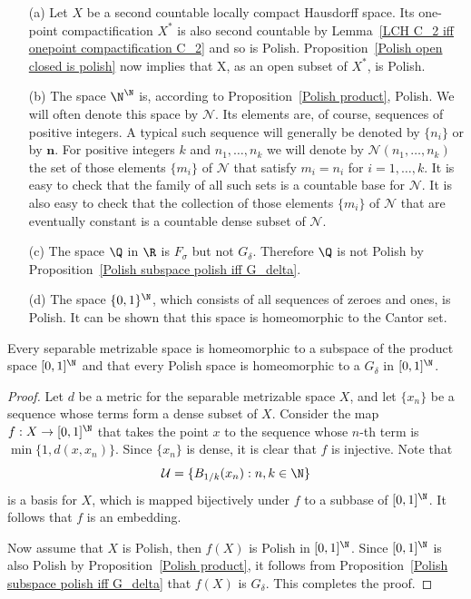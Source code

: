 \begin{example}
\mbox{}
\begin{itemize}
\item[(a)] Let $X$ be a second countable locally compact Hausdorff space. Its one-point compactification $X^*$ is also second countable by Lemma~\ref{LCH C_2 iff onepoint compactification C_2} and so is Polish. Proposition~\ref{Polish open closed is polish} now implies that X, as an open subset of $X^*$, is Polish.
\item[(b)] The space $\N^\N$ is, according to Proposition~\ref{Polish product}, Polish. We will often denote this space by $\mathscr{N}$. Its elements are, of course, sequences of positive integers. A typical such sequence will generally be denoted by $\{n_i\}$ or by $\mathbf{n}$. For positive integers $k$ and $n_1,\dots,n_k$ we will denote by $\mathscr{N}(n_1,\dots,n_k)$ the set of those elements $\{m_i\}$ of $\mathscr{N}$ that satisfy $m_i=n_i$ for $i=1,\dots,k$. It is easy to check that the family of all such sets is a countable base for $\mathscr{N}$. It is also easy to check that the collection of those elements $\{m_i\}$ of $\mathscr{N}$ that are eventually constant is a countable dense subset of $\mathscr{N}$.
\item[(c)] The space $\Q$ in $\R$ is $F_\sigma$ but not $G_\delta$. Therefore $\Q$ is not Polish by Proposition~\ref{Polish subspace polish iff G_delta}.
\item[(d)] The space $\{0,1\}^\N$, which consists of all sequences of zeroes and ones, is Polish. It can be shown that this space is homeomorphic to the Cantor set. 
\end{itemize}
\end{example}
\begin{proposition}\label{Polish embedd in [0,1]^N}
Every separable metrizable space is homeomorphic to a subspace of the product space $[0,1]^\N$ and that every Polish space is homeomorphic to a $G_\delta$ in $[0,1]^\N$.
\end{proposition}
\begin{proof}
Let $d$ be a metric for the separable metrizable space $X$, and let $\{x_n\}$ be a sequence whose terms form a dense subset of $X$. Consider the map $f:X\to[0,1]^\N$ that takes the point $x$ to the sequence whose $n$-th term is $\min\{1,d(x,x_n)\}$. Since $\{x_n\}$ is dense, it is clear that $f$ is injective. Note that
\[\mathcal{U}=\{B_{1/k}(x_n):n,k\in\N\}\]
is a basis for $X$, which is mapped bijectively under $f$ to a subbase of $[0,1]^\N$. It follows that $f$ is an embedding.\par
Now assume that $X$ is Polish, then $f(X)$ is Polish in $[0,1]^\N$. Since $[0,1]^\N$ is also Polish by Proposition~\ref{Polish product}, it follows from Proposition~\ref{Polish subspace polish iff G_delta} that $f(X)$ is $G_\delta$. This completes the proof.
\end{proof}
